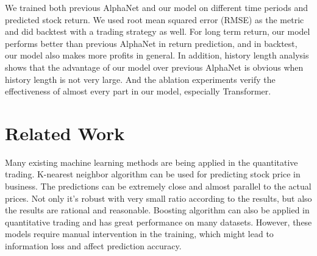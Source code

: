 \documentclass{article}
\begin{document}
\hspace{16}We trained both previous AlphaNet and our model on different time periods and predicted stock return. We used root mean squared error (RMSE) as the metric and did backtest with a trading strategy as well. For long term return, our model performs better than previous AlphaNet in return prediction, and in backtest, our model also makes more profits in general. In addition, history length analysis shows that the advantage of our model over previous AlphaNet is obvious when history length is not very large. And the ablation experiments verify the effectiveness of almost every part in our model, especially Transformer. 



\section{Related Work}
\hspace{16}Many existing machine learning methods are being applied in the quantitative trading.\cite{decision_tree}\cite{linear} K-nearest neighbor algorithm can be used for predicting stock price in business. The predictions can be extremely close and almost parallel to the actual prices. Not only it's robust with very small ratio according to the results, but also the results are rational and reasonable.\cite{knn}
Boosting algorithm can also be applied in quantitative trading and has great performance on many datasets.\cite{boosting} However, these models require manual intervention in the training, which might lead to information loss and affect prediction accuracy.
\end{document}
